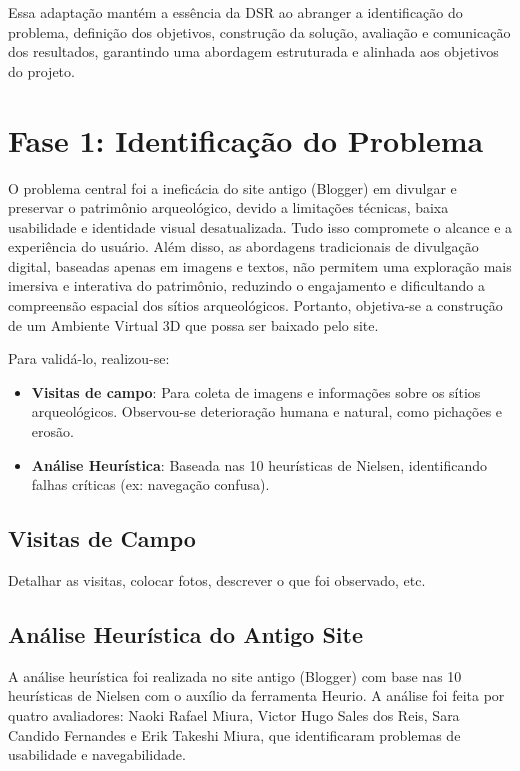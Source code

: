 Essa adaptação mantém a essência da DSR ao abranger a identificação do problema, definição dos objetivos, construção da solução, avaliação e comunicação dos resultados, garantindo uma abordagem estruturada e alinhada aos objetivos do projeto.

\section{Fase 1: Identificação do Problema}\label{definicao_do_problema}
O problema central foi a ineficácia do site antigo (Blogger) em divulgar e preservar o patrimônio arqueológico, devido a limitações técnicas, baixa usabilidade e identidade visual desatualizada. Tudo isso compromete o alcance e a experiência do usuário. Além disso, as abordagens tradicionais de divulgação digital, baseadas apenas em imagens e textos, não permitem uma exploração mais imersiva e interativa do patrimônio, reduzindo o engajamento e dificultando a compreensão espacial dos sítios arqueológicos. Portanto, objetiva-se a construção de um Ambiente Virtual 3D que possa ser baixado pelo site.

Para validá-lo, realizou-se:

\begin{itemize}
    \item \textbf{Visitas de campo}: Para coleta de imagens e informações sobre os sítios arqueológicos. Observou-se deterioração humana e natural, como pichações e erosão.
    \item \textbf{Análise Heurística}: Baseada nas 10 heurísticas de Nielsen, identificando falhas críticas (ex: navegação confusa).
\end{itemize}

\subsection{Visitas de Campo}

Detalhar as visitas, colocar fotos, descrever o que foi observado, etc.

\subsection{Análise Heurística do Antigo Site}
A análise heurística foi realizada no site antigo (Blogger) com base nas 10 heurísticas de Nielsen com o auxílio da ferramenta Heurio. A análise foi feita por quatro avaliadores: Naoki Rafael Miura, Victor Hugo Sales dos Reis, Sara Candido Fernandes e Erik Takeshi Miura, que identificaram problemas de usabilidade e navegabilidade.

